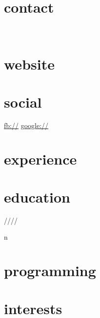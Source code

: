 \documentclass[]{fancy-cv}
\begin{document}

\begin{aside}
  \section{contact}
    \href{mailto:\myemail}{\myemail}
    ~
    \myphone
    ~
    \myaddress
    \mycity
  \section{website}
    \href{\mywebsite}{\mywebsite}
  \section{social}
    \href{http://facebook.com/\myfb}{fb://\myfb}
    \href{http://plug.google.com/\mygp}{google://\mygp}
\end{aside}

\section{experience}
\label{sec:experience}


\vspace{-1.5em}

\section{education}
\label{sec:education}

\begin{entrylist}
 \year/\degree/\school/\city/\subtitle in \education {
  \entry{\year}{\degree}{\school}{\subtitle}
}
\end{entrylist}

\vspace{-1em}
\section{programming}
\begin{multicols}{4}
  \programming
\end{multicols}

\section{interests}
\MakeLowercase\interests
\end{document}
